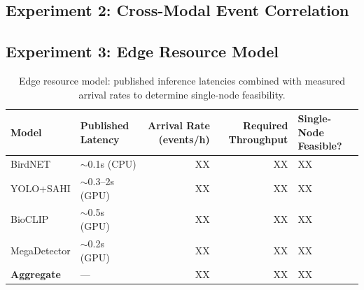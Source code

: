 \documentclass[letterpaper,twocolumn,10pt]{article}
\begin{document}

\subsection{Experiment 2: Cross-Modal Event Correlation}




\subsection{Experiment 3: Edge Resource Model}


\begin{table}[t]
\centering
\begin{tabular}{p{2.5cm} p{2cm} r r p{2.5cm}}
\toprule
\textbf{Model} & \textbf{Published Latency} & \textbf{Arrival Rate (events/h)} & \textbf{Required Throughput} & \textbf{Single-Node Feasible?} \\
\midrule
BirdNET & $\sim$0.1s (CPU) & XX & XX & XX \\
YOLO+SAHI & $\sim$0.3--2s (GPU) & XX & XX & XX \\
BioCLIP & $\sim$0.5s (GPU) & XX & XX & XX \\
MegaDetector & $\sim$0.2s (GPU) & XX & XX & XX \\
\midrule
\textbf{Aggregate} & --- & XX & XX & XX \\
\bottomrule
\end{tabular}
\caption{Edge resource model: published inference latencies combined with measured arrival rates to determine single-node feasibility.}
\label{table:resource_model}
\end{table}
\end{document}
